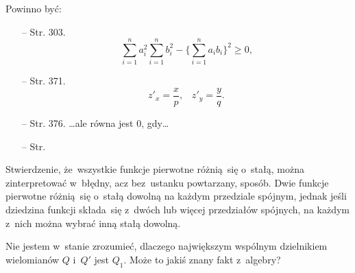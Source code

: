 \documentclass[a4paper,11pt]{article}
\begin{document}


Powinno być:
\begin{itemize}
\item[--] Str. 303.
$$\sum_{ i = 1 }^{ n } a_{ i }^{2} \sum_{ i = 1 }^{ n } b_{ i }^{ 2 } - \{ \sum_{ i = 1 }^{ n } a_{ i } b_{ i } \}^{ 2 } \geq 0 \textrm{,}$$
\item[--] Str. 371.
  $$z'_{ x } = \frac{ x }{ p } \textrm{,} \quad z'_{ y } = \frac{ y }{
    q } \textrm{.}$$
\item[--] Str. 376. \ldots ale równa jest 0, gdy\ldots
\item[--] Str.
\end{itemize}

\vspace{\spaceTwo}










\start {} Stwierdzenie, że~wszystkie funkcje pierwotne różnią~się
o~stałą, można zinterpretować w~błędny, acz bez~ustanku powtarzany,
sposób. Dwie funkcje pierwotne różnią~się o~stałą dowolną na każdym
przedziale spójnym, jednak jeśli dziedzina funkcji składa~się z~dwóch
lub więcej przedziałów spójnych, na każdym z~nich można wybrać inną
stałą dowolną.

\vspace{\spaceFour}


\start {} Nie jestem w~stanie zrozumieć, dlaczego największym
wspólnym dzielnikiem wielomianów $Q$ i~$Q'$ jest $Q_{ 1 }$. Może to
jakiś znany fakt z~algebry? \Dok
\end{document}
